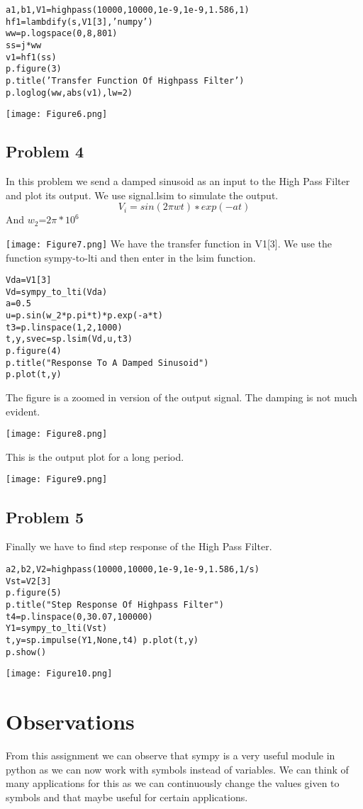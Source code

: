\documentclass[10pt,english, openany]{book}
\begin{document}
\begin{verbatim}
a1,b1,V1=highpass(10000,10000,1e-9,1e-9,1.586,1) 
hf1=lambdify(s,V1[3],’numpy’) 
ww=p.logspace(0,8,801)
ss=j*ww
v1=hf1(ss)
p.figure(3)
p.title(’Transfer Function Of Highpass Filter’) 
p.loglog(ww,abs(v1),lw=2)
\end{verbatim}

{\centering \texttt{[image: Figure6.png]}}

\subsection{Problem 4}
In this problem we send a damped sinusoid as an input to the High Pass Filter and plot its output. We use signal.lsim to simulate the output.
\begin{equation*}
V_{i} =sin(2 \pi wt)∗exp(−at)
\end{equation*}
And $w_{2}$=$2\pi*10^{6}$ 

{\centering \texttt{[image: Figure7.png]}}
We have the transfer function in V1[3]. We use the function sympy-to-lti and then enter in the lsim function.\par
\begin{verbatim}
Vda=V1[3]
Vd=sympy_to_lti(Vda)
a=0.5
u=p.sin(w_2*p.pi*t)*p.exp(-a*t) 
t3=p.linspace(1,2,1000) 
t,y,svec=sp.lsim(Vd,u,t3)
p.figure(4)
p.title("Response To A Damped Sinusoid")
p.plot(t,y)
\end{verbatim}


The figure is a zoomed in version of the output signal. The damping is not much evident.

{\centering \texttt{[image: Figure8.png]}}

This is the output plot for a long period.

{\centering \texttt{[image: Figure9.png]}}

\subsection{Problem 5}
Finally we have to find step response of the High Pass Filter.

\begin{verbatim}
a2,b2,V2=highpass(10000,10000,1e-9,1e-9,1.586,1/s) 
Vst=V2[3]
p.figure(5)
p.title("Step Response Of Highpass Filter") 
t4=p.linspace(0,30.07,100000)
Y1=sympy_to_lti(Vst) 
t,y=sp.impulse(Y1,None,t4) p.plot(t,y)
p.show()
\end{verbatim}

{\centering\texttt{[image: Figure10.png]}}
\section{Observations}
From this assignment we can observe that sympy is a very useful module in python as we can now work with symbols instead of variables. We can think of many applications for this as we can continuously change the values given to symbols and that maybe useful for certain applications.
\end{document}
